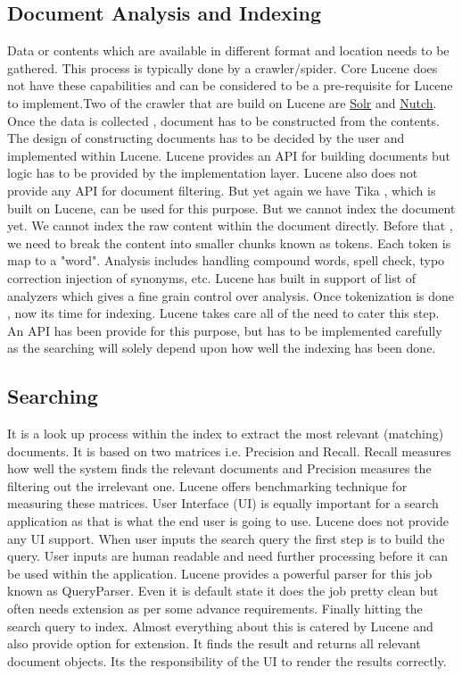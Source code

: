 \documentclass[9pt,twocolumn,twoside]{../../styles/osajnl}
\begin{document}
\subsection{Document Analysis and Indexing}
Data or contents which are available in different format and location needs to be gathered. This process is typically done by a crawler/spider. Core Lucene does not have these capabilities and can be considered to be a pre-requisite for Lucene to implement.Two of the crawler that are build on Lucene are \href{http://lucene.apache.org/solr}{Solr} and \href{http://lucene.apache.org/nutch}{Nutch}. Once the data is collected , document has to be constructed from the contents. The design of constructing documents has to be decided by the user and implemented within Lucene. Lucene provides an API for building documents but logic has to be provided by the implementation layer. Lucene also does not provide any API for document filtering. But yet again we have Tika , which is built on Lucene, can be used for this purpose. But we cannot index the document yet. We cannot index the raw content within the document directly. Before that , we need to break the content into smaller chunks known as tokens. Each token is map to a "word". Analysis includes handling compound words, spell check, typo correction injection of synonyms, etc. Lucene has built in support of list of analyzers which gives a fine grain control over analysis. Once tokenization is done , now its time for indexing. Lucene takes care all of the need to cater this step. An API has been provide for this purpose, but has to be implemented carefully as the searching will solely depend upon how well the indexing has been done.


\subsection{Searching}
It is a look up process within the index to extract the most relevant (matching) documents. It is based on two matrices i.e. Precision and Recall. Recall measures how well the system finds the relevant documents and Precision measures the filtering out the irrelevant one. Lucene offers benchmarking technique for measuring these matrices. User Interface (UI) is equally important for a search application as that is what the end user is going to use. Lucene does not provide any UI support. When user inputs the search query the first step is to build the query. User inputs are human readable and need further processing before it can be used within the application. Lucene provides a powerful parser for this job known as QueryParser. Even it is default state it does the job pretty clean but often needs extension as per some advance requirements. Finally hitting the search query to index. Almost everything about this is catered by Lucene and also provide option for extension. It finds the result and returns all relevant document objects. Its the responsibility of the UI to render the results correctly.
\end{document}
